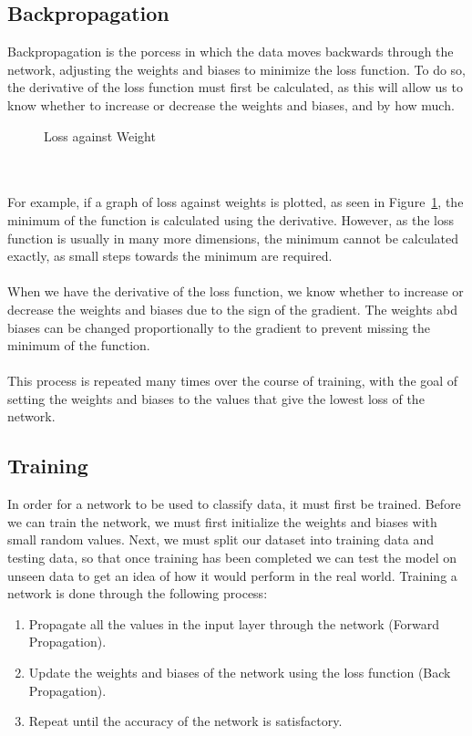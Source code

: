 \documentclass[titlepage]{article}
\begin{document}
\subsection{Backpropagation}
Backpropagation is the porcess in which the data moves backwards through the network, adjusting the weights and biases to minimize the loss function. To do so, the derivative of the loss function must first be calculated, as this will allow us to know whether to increase or decrease the weights and biases, and by how much.
\begin{figure}[h!]
    \begin{center}
    \end{center}
    \caption{Loss against Weight}
    \label{fig:loss-vs-weights}
\end{figure}
\\\\
For example, if a graph of loss against weights is plotted, as seen in Figure~\ref{fig:loss-vs-weights}, the minimum of the function is calculated using the derivative. However, as the loss function is usually in many more dimensions, the minimum cannot be calculated exactly, as small steps towards the minimum are required. 
\\\\
When we have the derivative of the loss function, we know whether to increase or decrease the weights and biases due to the sign of the gradient. The weights abd biases can be changed proportionally to the gradient to prevent missing the minimum of the function.
\\\\
This process is repeated many times over the course of training, with the goal of setting the weights and biases to the values that give the lowest loss of the network.
\subsection{Training}
In order for a network to be used to classify data, it must first be trained. Before we can train the network, we must first initialize the weights and biases with small random values. Next, we must split our dataset into training data and testing data, so that once training has been completed we can test the model on unseen data to get an idea of how it would perform in the real world. Training a network is done through the following process:
\begin{enumerate}
    \item Propagate all the values in the input layer through the network (Forward Propagation).
    \item Update the weights and biases of the network using the loss function (Back Propagation).
    \item Repeat until the accuracy of the network is satisfactory.
\end{enumerate}
\newpage
\end{document}
